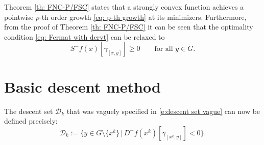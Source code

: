 \documentclass{article}
\theoremstyle{plain}\newtheorem{theorem}{Theorem}[section]
\theoremstyle{plain}\newtheorem{definition}[theorem]{Definition}
\theoremstyle{plain}\newtheorem{lemma}[theorem]{Lemma}
\theoremstyle{definition}\newtheorem{remark}[theorem]{Remark}
\theoremstyle{definition}\newtheorem{example}[theorem]{Example}
\theoremstyle{plain}\newtheorem{proposition}[theorem]{Proposition}
\theoremstyle{plain}\newtheorem{inference}[theorem]{Inference}
\theoremstyle{plain}\newtheorem{corollary}[theorem]{Corollary}
\theoremstyle{plain}\newtheorem{assumption}[theorem]{Assumption}
\newcommand{\Dcal}{{\mathcal D}}
\begin{document}
Theorem \ref{th: FNC-P/FSC} states that a strongly convex function achieves a pointwise  $p$-th order growth \eqref{eq: p-th growth} at its minimizers. Furthermore, from the proof of  Theorem \ref{th: FNC-P/FSC} it can be seen that the optimality condition \eqref{eq: Fermat with dervt} can be relaxed to
\begin{equation}\label{eq: Fermat with slp}
    S^-f(\bar{x})[\gamma_{[\bar{x},y]}]\geq 0 \qquad\text{for all}\,\,y\in G.
\end{equation}
\section{Basic descent method}\label{sec: BD method}
The descent set $\Dcal_k$ that was vaguely specified in \eqref{e:descent set vague} can now be defined  precisely:
\begin{equation}\label{e:descent set}
    \Dcal_k:=\bigl\{ y\in G\setminus\{x^k\} \,\big|\, D^-f(x^k)[\gamma_{[x^k,y]}]<0 \bigr\}.
\end{equation}
\end{document}

